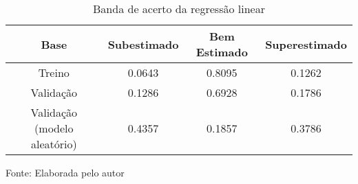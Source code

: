 
\begin{table}[h]
\centering
\caption{Banda de acerto da regressão linear}
\label{tab:cap3_band_reg_lin}
\begin{tabular}{cccc}
Base & Subestimado & Bem Estimado & Superestimado \\
\hline
Treino & 0.0643 & 0.8095 & 0.1262 \\
Validação & 0.1286 & 0.6928 & 0.1786 \\
Validação (modelo aleatório) & 0.4357 & 0.1857 & 0.3786 \\
\hline
\end{tabular}

Fonte: Elaborada pelo autor
\end{table}
